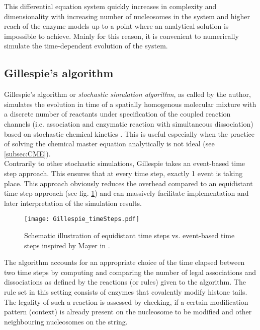             This differential equation system quickly increases in complexity and dimensionality with increasing number of nucleosomes in the system and higher reach of the enzyme models up to a point where an analytical solution is impossible to achieve. Mainly for this reason, it is convenient to numerically simulate the time-dependent evolution of the system.
        \subsection{Gillespie's algorithm}
        \label{subsec:Gillespie}
            Gillespie's algorithm or \textit{stochastic simulation algorithm}, as called by the author, simulates the evolution in time of a spatially homogenous molecular mixture with a discrete number of reactants under specification of the coupled reaction channels (i.e. association and enzymatic reaction with simultaneous dissociation) based on stochastic chemical kinetics \cite{gillespie1976general, gillespie1992rigorous}. This is useful especially when the practice of solving the chemical master equation analytically is not ideal (see \ref{subsec:CME}).\\

            Contrarily to other stochastic simulations, Gillespie takes an event-based time step approach. This ensures that at every time step, exactly 1 event is taking place. This approach obviously reduces the overhead compared to an equidistant time step approach (see fig. \ref{img:Gillespie_timeSteps}) and can massively facilitate implementation and later interpretation of the simulation results.

            \begin{figure}[htpb!]
                \centering
                \texttt{[image: Gillespie\_timeSteps.pdf]}
                \caption{Schematic illustration of equidistant time steps vs. event-based time steps inspired by Mayer in \cite{mayer2020langevin}.}
                \label{img:Gillespie_timeSteps}
            \end{figure}

            The algorithm accounts for an appropriate choice of the time elapsed between two time steps by computing and comparing the number of legal associations and dissociations as defined by the reactions (or rules) given to the algorithm. The rule set in this setting consists of enzymes that covalently modify histone tails. The legality of such a reaction is assessed by checking, if a certain modification pattern (context) is already present on the nucleosome to be modified and other neighbouring nucleosomes on the string.

